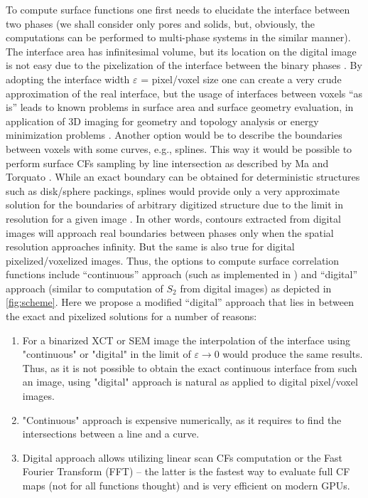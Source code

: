 \documentclass[reprint,amsmath,amssymb,aps,pre,showkeys,showpacs]{revtex4-1}
\begin{document}
To compute surface functions one first needs to elucidate the interface between
two phases (we shall consider only pores and solids, but, obviously, the
computations can be performed to multi-phase systems in the similar manner). The
interface area has infinitesimal volume, but its location on the digital image
is not easy due to the pixelization of the interface between the binary phases
\cite{ma2018SS}. By adopting the interface width $\varepsilon$ = pixel/voxel size one can create
a very crude approximation of the real interface, but the usage of interfaces
between voxels ``as is'' leads to known problems in surface area and surface
geometry evaluation, in application of 3D imaging for geometry and topology
analysis \cite{AWR_PNM,PNM_Morse} or energy minimization problems
\cite{frank2018energy}. Another option would be to describe the boundaries
between voxels with some curves, e.g., splines. This way it would be possible
to perform surface CFs sampling by line intersection as described by Ma and
Torquato \cite{ma2018SS}. While an exact boundary can be obtained for
deterministic structures such as disk/sphere packings, splines would provide
only a very approximate solution for the boundaries of arbitrary digitized
structure due to the limit in resolution for a given image
\cite{gerke2012tomographic}. In other words, contours extracted from digital
images will approach real boundaries between phases only when the spatial
resolution approaches infinity. But the same is also true for digital
pixelized/voxelized images. Thus, the options to compute surface correlation
functions include ``continuous'' approach (such as implemented in
\cite{ma2018SS}) and ``digital'' approach (similar to computation of $S_2$ from
digital images) as depicted in \cref{fig:scheme}. Here we propose a modified
``digital'' approach that lies in between the exact and pixelized solutions for
a number of reasons:
\begin{enumerate}
  \item For a binarized XCT or SEM image the interpolation of the interface
    using "continuous" or "digital" in the limit of $\varepsilon \to 0$ would
    produce the same results. Thus, as it is not possible to obtain the exact
    continuous interface from such an image, using "digital" approach is natural
    as applied to digital pixel/voxel images.
  \item "Continuous" approach is expensive numerically, as it requires to find the
    intersections between a line and a curve.
  \item Digital approach allows utilizing linear scan CFs computation or the Fast Fourier Transform (FFT) -- the latter is the fastest way
    to evaluate full CF maps (not for all functions thought) and is very efficient on modern GPUs.
\end{enumerate}
\end{document}
